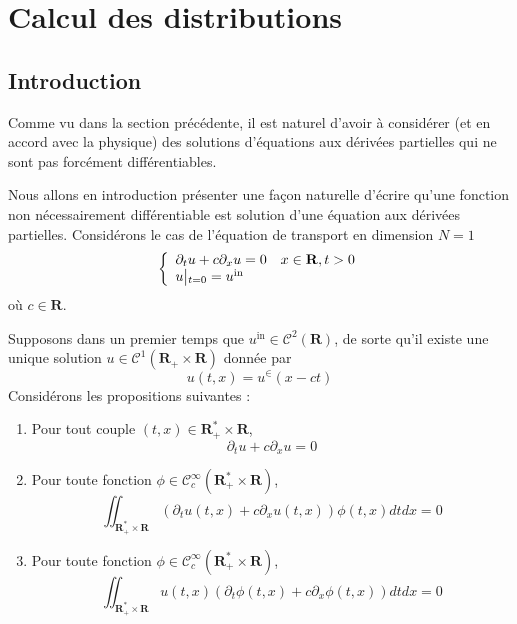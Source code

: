 \newpage

\section{Calcul des distributions}

    \subsection{Introduction}

        Comme vu dans la section précédente, il est naturel d’avoir à considérer (et en accord avec la physique) des solutions d’équations aux dérivées partielles qui ne sont pas forcément différentiables. 

        Nous allons en introduction présenter une façon naturelle d’écrire qu’une fonction non nécessairement différentiable est solution d’une équation aux dérivées partielles. Considérons le cas de l’équation de transport en dimension $N = 1$
        \[ \left\{      \begin{array}{lc}
            \partial_t u + c \partial_x u = 0 & x \in \mathbf{R}, t > 0 \\
            u \big|\vphantom{|}_{t=0} = u^{\text{in}} 
        \end{array} \right. \kern-\nulldelimiterspace \]   
        où $c \in \mathbf{R}$. 

        Supposons dans un premier temps que $u^{\text{in}} \in \mathcal{C}^2(\mathbf{R})$, de sorte qu’il existe une unique solution $u \in \mathcal{C}^1(\mathbf{R}_+ \times \mathbf{R})$ donnée par 
        \[ u(t,x) = u^{\in}(x - ct) \]   
        Considérons les propositions suivantes : 
        \begin{enumerate}[label=($p_{\arabic*}$)]
            \item Pour tout couple $(t,x) \in \mathbf{R}^*_+ \times \mathbf{R}$, 
            \[ \partial_t u + c \partial_x u = 0 \]    
            \item Pour toute fonction $\phi \in \mathcal{C}_c^{\infty}(\mathbf{R}_+^* \times \mathbf{R})$, 
            \[ \iint_{\mathbf{R}_+^* \times \mathbf{R}} (\partial_t u(t,x) + c \partial_x u(t,x))\phi(t,x) dt dx = 0 \] 
            \item Pour toute fonction $\phi \in \mathcal{C}_c^{\infty}(\mathbf{R}_+^* \times \mathbf{R})$, 
            \[ \iint_{\mathbf{R}_+^* \times \mathbf{R}} u(t,x)(\partial_t \phi(t,x) + c \partial_x \phi(t,x)) dt dx = 0 \] 
        \end{enumerate}


